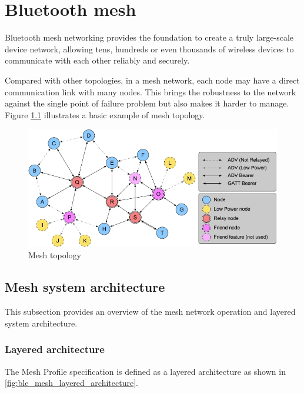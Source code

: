 \documentclass[\main/main.tex]{subfiles}
\begin{document}
\graphicspath{{img/}{ble_mesh/img/}}

\chapter{Bluetooth mesh}

Bluetooth mesh networking provides the foundation to create a truly large-scale device network, allowing tens, hundreds or even thousands of wireless devices to communicate with each other reliably and securely.

Compared with other topologies, in a mesh network, each node may have a direct communication link with many nodes. This brings the robustness to the network against the single point of failure problem but also makes it harder to manage. Figure \ref{fig:Mesh topology} illustrates a basic example of mesh topology.

\begin{figure}[H]
    \begin{center}
        \includegraphics[scale=0.7]{mesh_topology.jpg}
    \end{center}
    \caption{Mesh topology}
    \label{fig:Mesh topology}
\end{figure}


\section{Mesh system architecture \cite{bluetooth_sig:mesh_profile_specification_1_0_1}}
This subsection provides an overview of the mesh network operation and layered system architecture.

\subsection{Layered architecture}

The Mesh Profile specification is defined as a layered architecture as shown in \ref{fig:ble_mesh_layered_architecture}.
\end{document}
